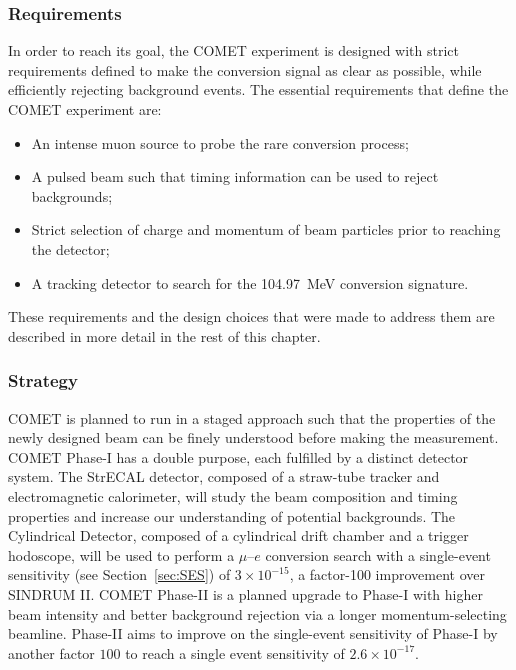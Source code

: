 \subsubsection{Requirements}
In order to reach its goal, the COMET experiment is designed with strict
requirements defined to make the conversion signal as clear as possible, while
efficiently rejecting background events. The essential requirements that define
the COMET experiment are:
\begin{itemize}
    \item An intense muon source to probe the rare conversion process;
    \item A pulsed beam such that timing information can be used to reject
    backgrounds;
    \item Strict selection of charge and momentum of beam particles prior to
    reaching the detector;
    \item A tracking detector to search for the \SI{104.97}{\MeV} conversion
    signature.
\end{itemize}
These requirements and the design choices that were made to address them are
described in more detail in the rest of this chapter.

\subsubsection{Strategy}
COMET is planned to run in a staged approach such that the properties of the
newly designed beam can be finely understood before making the measurement.
COMET Phase-I has a double purpose, each fulfilled by a distinct detector
system. The StrECAL detector, composed of a straw-tube tracker and
electromagnetic calorimeter, will study the beam composition and timing
properties and increase our understanding of potential backgrounds. The
Cylindrical Detector, composed of a cylindrical drift chamber and a trigger
hodoscope, will be used to perform a $\mu$--$e$ conversion search with a
single-event sensitivity (see Section~\ref{sec:SES}) of $3\times 10^{-15}$, a
factor-100 improvement over SINDRUM II. COMET Phase-II is a planned upgrade to
Phase-I with higher beam intensity and better background rejection via a longer
momentum-selecting beamline. Phase-II aims to improve on the single-event
sensitivity of Phase-I by another factor $100$ to reach a single event
sensitivity of $2.6\times 10^{-17}$.

